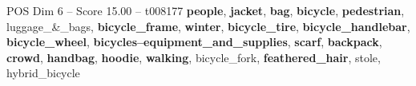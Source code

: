 \begin{textsample}{POS Dim 6 – Score 15.00 – t008177}  \label{ex:f6_pos_005}
\textbf{people}, \textbf{jacket}, \textbf{bag}, \textbf{bicycle}, \textbf{pedestrian}, luggage\_\&\_bags, \textbf{bicycle\_frame}, \textbf{winter}, \textbf{bicycle\_tire}, \textbf{bicycle\_handlebar}, \textbf{bicycle\_wheel}, \textbf{bicycles--equipment\_and\_supplies}, \textbf{scarf}, \textbf{backpack}, \textbf{crowd}, \textbf{handbag}, \textbf{hoodie}, \textbf{walking}, bicycle\_fork, \textbf{feathered\_hair}, stole, hybrid\_bicycle

\end{textsample}
